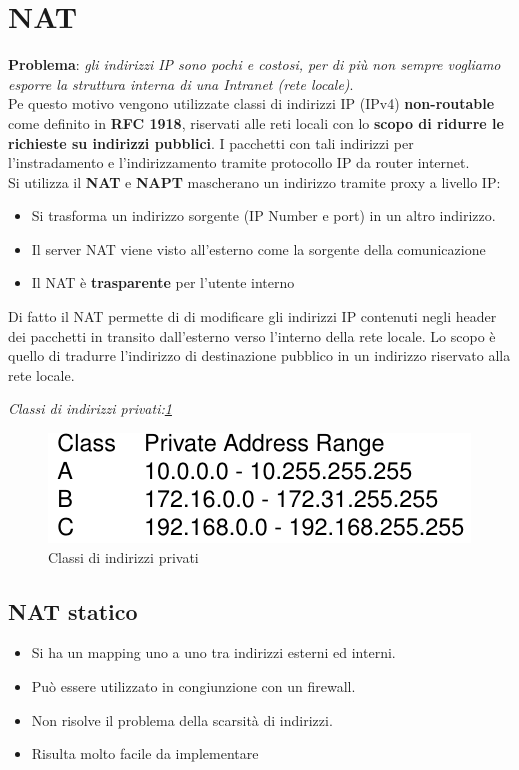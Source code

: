 \documentclass[12pt]{article}
\begin{document}
	\section{NAT}
		\textbf{Problema}: \textit{gli indirizzi IP sono pochi e costosi, per di più non sempre vogliamo esporre la struttura interna di una Intranet (rete locale)}.\\
		Pe questo motivo vengono utilizzate classi di indirizzi IP (IPv4) \textbf{non-routable} come definito in \textbf{RFC 1918}, riservati alle reti locali con lo \textbf{scopo di ridurre le richieste su indirizzi pubblici}. I pacchetti con tali indirizzi per l'instradamento e l'indirizzamento tramite protocollo IP da router internet.\\
		Si utilizza il \textbf{NAT} e \textbf{NAPT} mascherano un indirizzo tramite proxy a livello IP:
		\begin{itemize}
			\item Si trasforma un indirizzo sorgente (IP Number e port) in un altro indirizzo.
			\item Il server NAT viene visto all'esterno come la sorgente della comunicazione
			\item Il NAT è \textbf{trasparente} per l'utente interno 
		\end{itemize}
		Di fatto il NAT permette di di modificare gli indirizzi IP contenuti negli header dei pacchetti in transito dall'esterno verso l'interno della rete locale. Lo scopo è quello di tradurre l'indirizzo di destinazione pubblico in un indirizzo riservato alla rete locale.
		
		\textit{Classi di indirizzi privati:\ref{fig:1}}
		\begin{figure}[h!]
			\centering
			\includegraphics[scale=0.40]{img/class.PNG}
			\caption{Classi di indirizzi privati\label{fig:1}}
		\end{figure}
		
		\subsection{NAT statico}
			\begin{itemize}
				\item Si ha un mapping uno a uno tra indirizzi esterni ed interni.
				\item Può essere utilizzato in congiunzione con un firewall.
				\item Non risolve il problema della scarsità di indirizzi.
				\item Risulta molto facile da implementare	
			\end{itemize}
		
\end{document}
